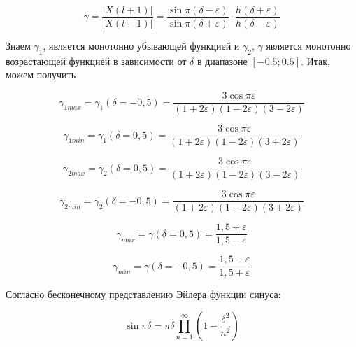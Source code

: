 \begin{equation}
	\label{eq:equation64}
	\gamma = \frac{\left| X(l+1)\right|}{\left| X(l-1)\right|} = \frac{\sin \pi({\delta - \varepsilon})}{\sin \pi ({\delta + \varepsilon})} \cdot \frac{h({\delta + \varepsilon})}{h(\delta - \varepsilon)}
\end{equation}

Знаем $\gamma_1$, является монотонно убывающей функцией и $\gamma_2$, $\gamma$ является монотонно возрастающей функцией в зависимости от $\delta$ в диапазоне $[-0.5;0.5]$. Итак, можем получить

\begin{equation}
	\label{eq:equation65}
	\gamma_{1 max} = \gamma_1 (\delta = - 0,5) = \frac{3 \cos \pi \varepsilon}{(1 + 2 \varepsilon)(1 - 2 \varepsilon)(3 - 2 \varepsilon)}
\end{equation}

\begin{equation}
	\label{eq:equation66}
	\gamma_{1 min} = \gamma_1 (\delta = 0,5) = \frac{3 \cos \pi \varepsilon}{(1 + 2 \varepsilon)(1 - 2 \varepsilon)(3 + 2 \varepsilon)}
\end{equation}

\begin{equation}
	\label{eq:equation67}
	\gamma_{2 max} = \gamma_2 (\delta = 0,5) = \frac{3 \cos \pi \varepsilon}{(1 + 2 \varepsilon)(1 - 2 \varepsilon)(3 - 2 \varepsilon)}
\end{equation}

\begin{equation}
	\label{eq:equation68}
	\gamma_{2 min} = \gamma_2 (\delta = -0,5) = \frac{3 \cos \pi \varepsilon}{(1 + 2 \varepsilon)(1 - 2 \varepsilon)(3 + 2 \varepsilon)}
\end{equation}

\begin{equation}
	\label{eq:equation69}
	\gamma_{max} = \gamma(\delta = 0,5) = \frac{1,5+ \varepsilon}{1,5 - \varepsilon}
\end{equation}

\begin{equation}
	\label{eq:equation70}
	\gamma_{min} = \gamma(\delta = -0,5) = \frac{1,5 - \varepsilon}{1,5 + \varepsilon}
\end{equation}

Согласно бесконечному представлению Эйлера функции синуса:

\begin{equation}
	\label{eq:equation71}
	\sin \pi \delta = \pi \delta \prod\limits_{n = 1}^\infty \left( 1- \frac{\delta^2}{n^2} \right) 
\end{equation}

